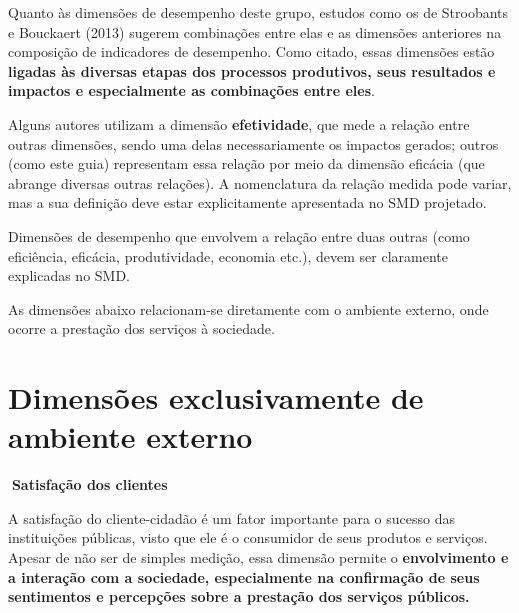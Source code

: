 \documentclass[
  letterpaper,
  DIV=11,
  numbers=noendperiod]{scrreprt}
\begin{document}
Quanto às dimensões de desempenho deste grupo, estudos como os de
Stroobants e Bouckaert (2013) sugerem combinações entre elas e as
dimensões anteriores na composição de indicadores de desempenho. Como
citado, essas dimensões estão \textbf{ligadas às diversas etapas dos
processos produtivos, seus resultados e impactos e especialmente as
combinações entre eles}.

Alguns autores utilizam a dimensão \textbf{efetividade}, que mede a
relação entre outras dimensões, sendo uma delas necessariamente os
impactos gerados; outros (como este guia) representam essa relação por
meio da dimensão eficácia (que abrange diversas outras relações). A
nomenclatura da relação medida pode variar, mas a sua definição deve
estar explicitamente apresentada no SMD projetado.

\begin{tcolorbox}[enhanced jigsaw, colframe=quarto-callout-tip-color-frame, opacityback=0, toprule=.15mm, breakable, leftrule=.75mm, title=\textcolor{quarto-callout-tip-color}{\faLightbulb}\hspace{0.5em}{Dica}, rightrule=.15mm, colbacktitle=quarto-callout-tip-color!10!white, colback=white, arc=.35mm, bottomtitle=1mm, toptitle=1mm, bottomrule=.15mm, titlerule=0mm, opacitybacktitle=0.6, coltitle=black, left=2mm]

Dimensões de desempenho que envolvem a relação entre duas outras (como
eficiência, eficácia, produtividade, economia etc.), devem ser
claramente explicadas no SMD.

\end{tcolorbox}

As dimensões abaixo relacionam-se diretamente com o ambiente externo,
onde ocorre a prestação dos serviços à sociedade.

\hypertarget{dimensuxf5es-exclusivamente-de-ambiente-externo}{%
\section{Dimensões exclusivamente de ambiente
externo}\label{dimensuxf5es-exclusivamente-de-ambiente-externo}}

\begin{tcolorbox}[enhanced jigsaw, opacityback=0, toprule=.15mm, breakable, leftrule=.75mm, rightrule=.15mm, left=2mm, colback=white, arc=.35mm, bottomrule=.15mm]

\textbf{🔽{Satisfação dos clientes}}\vspace{2mm}

A satisfação do cliente-cidadão é um fator importante para o sucesso das
instituições públicas, visto que ele é o consumidor de seus produtos e
serviços. Apesar de não ser de simples medição, essa dimensão permite o
\textbf{envolvimento e a interação com a sociedade, especialmente na
confirmação de seus sentimentos e percepções sobre a prestação dos
serviços públicos.}

\end{tcolorbox}
\end{document}

